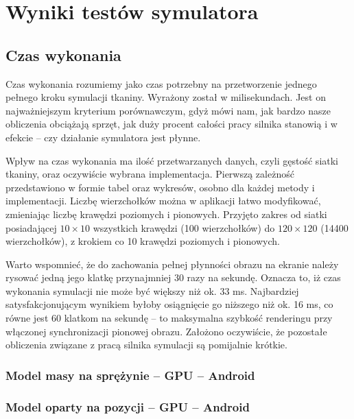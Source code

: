 \chapter{Wyniki testów symulatora}
\label{t:wyniki}

	\section{Czas wykonania}
	\label{t:wyniki:czas_wykonania}

		Czas wykonania rozumiemy jako czas potrzebny na przetworzenie jednego pełnego kroku symulacji tkaniny. Wyrażony został w milisekundach. Jest on najważniejszym kryterium porównawczym, gdyż mówi nam, jak bardzo nasze obliczenia obciążają sprzęt, jak duży procent całości pracy silnika stanowią i w efekcie -- czy działanie symulatora jest płynne. 
		
		Wpływ na czas wykonania ma ilość przetwarzanych danych, czyli gęstość siatki tkaniny, oraz oczywiście wybrana implementacja. Pierwszą zależność przedstawiono w formie tabel oraz wykresów, osobno dla każdej metody i implementacji. Liczbę wierzchołków można w aplikacji łatwo modyfikować, zmieniając liczbę krawędzi poziomych i pionowych. Przyjęto zakres od siatki posiadającej \(10 \times 10 \) wszystkich krawędzi (100 wierzchołków) do \( 120 \times 120 \) (14400 wierzchołków), z krokiem co 10 krawędzi poziomych i pionowych.
		
		Warto wspomnieć, że do zachowania pełnej płynności obrazu na ekranie należy rysować jedną jego klatkę przynajmniej 30 razy na sekundę. Oznacza to, iż czas wykonania symulacji nie może być większy niż ok. 33 ms. Najbardziej satysfakcjonującym wynikiem byłoby osiągnięcie go niższego niż ok. 16 ms, co równe jest 60 klatkom na sekundę -- to maksymalna szybkość renderingu przy włączonej synchronizacji pionowej obrazu. Założono oczywiście, że pozostałe obliczenia związane z pracą silnika symulacji są pomijalnie krótkie.
		
		\subsection{Model masy na sprężynie -- GPU -- Android}
		\label{t:wyniki:czas_wykonania:ms_gpu_andro}
		
		
		\subsection{Model oparty na pozycji -- GPU -- Android}
		\label{t:wyniki:czas_wykonania:pb_gpu_andro}
		
